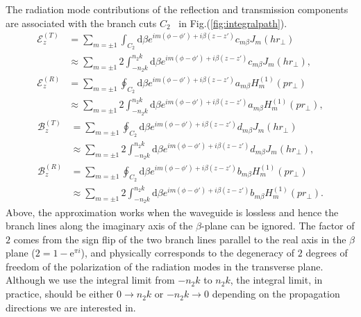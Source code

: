 \documentclass[]{report}
\begin{document}
The radiation mode contributions of the reflection and transmission components are associated with the branch cuts $ C_2 $~\cite{Klimov2004} in Fig.(\ref{fig:integralpath}).
\begin{subequations}\label{ET0RC2}
\begin{align}
\mathcal{E}^{(T)}_z &= \sum_{m=\pm 1} \int_{C_2} \mathrm{d}\beta e^{im(\phi-\phi') + i\beta (z-z')} c_{m\beta} J_m (hr\!_\perp)\\
&\approx \sum_{m=\pm 1} 2\int_{-n_2k}^{n_2k} \mathrm{d}\beta e^{im(\phi-\phi') + i\beta (z-z')} c_{m\beta} J_m (hr\!_\perp),\\
\mathcal{E}^{(R)}_z &= \sum_{m=\pm 1} \oint_{C_2} \mathrm{d}\beta e^{im(\phi-\phi') + i\beta (z-z')} a_{m\beta} H_m^{(1)} (pr\!_\perp)\\
&\approx \sum_{m=\pm 1} 2\int_{-n_2k}^{n_2k} \mathrm{d}\beta e^{im(\phi-\phi') + i\beta (z-z')} a_{m\beta} H_m^{(1)} (pr\!_\perp),
\end{align}
\end{subequations}
\begin{subequations}\label{BT0RC2}
\begin{align}
\mathcal{B}^{(T)}_z &= \sum_{m=\pm 1} \oint_{C_2} \mathrm{d}\beta e^{im(\phi-\phi') + i\beta (z-z')} d_{m\beta} J_m (hr\!_\perp)\\
&\approx \sum_{m=\pm 1} 2\int_{-n_2k}^{n_2k} \mathrm{d}\beta e^{im(\phi-\phi') + i\beta (z-z')} d_{m\beta} J_m (hr\!_\perp),\\
\mathcal{B}^{(R)}_z &= \sum_{m=\pm 1} \oint_{C_2} \mathrm{d}\beta e^{im(\phi-\phi') + i\beta (z-z')} b_{m\beta} H_m^{(1)} (pr\!_\perp)\\
&\approx \sum_{m=\pm 1} 2\int_{-n_2k}^{n_2k} \mathrm{d}\beta e^{im(\phi-\phi') + i\beta (z-z')} b_{m\beta} H_m^{(1)} (pr\!_\perp).
\end{align}
\end{subequations}
Above, the approximation works when the waveguide is lossless and hence the branch lines along the imaginary axis of the $ \beta $-plane can be ignored. The factor of $ 2 $ comes from the sign flip of the two branch lines parallel to the real axis in the $ \beta $ plane ($ 2=1-\mathrm{e}^{\pi i} $), and physically corresponds to the degeneracy of $ 2 $ degrees of freedom of the polarization of the radiation modes in the transverse plane. Although we use the integral limit from $ -n_2k $ to $ n_2k $, the integral limit, in practice, should be either $ 0 \rightarrow n_2k$ or $ -n_2k\rightarrow 0 $ depending on the propagation directions we are interested in. 
\end{document}
